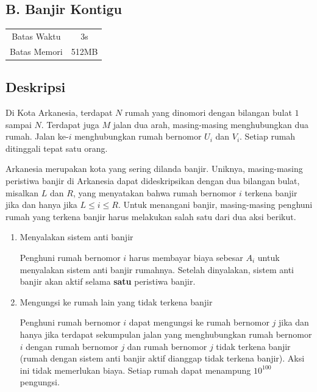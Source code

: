 \documentclass{article}
\begin{document}
\begin{center}
    \section*{B. Banjir Kontigu} %

    \begin{tabular}{ | c c | }
        \hline
        Batas Waktu  & 3s \\    %
        Batas Memori & 512MB \\  %
        \hline
    \end{tabular}
\end{center}

\subsection*{Deskripsi}
Di Kota Arkanesia, terdapat $N$ rumah yang dinomori dengan bilangan bulat $1$ sampai $N$. Terdapat juga $M$ jalan dua arah, masing-masing menghubungkan dua rumah. Jalan ke-$i$ menghubungkan rumah bernomor $U_i$ dan $V_i$. Setiap rumah ditinggali tepat satu orang.

Arkanesia merupakan kota yang sering dilanda banjir. Uniknya, masing-masing peristiwa banjir di Arkanesia dapat dideskripsikan dengan dua bilangan bulat, misalkan $L$ dan $R$, yang menyatakan bahwa rumah bernomor $i$ terkena banjir jika dan hanya jika $L \leq i \leq R$. Untuk menangani banjir, masing-masing penghuni rumah yang terkena banjir harus melakukan salah satu dari dua aksi berikut.
\begin{enumerate}
    \item Menyalakan sistem anti banjir
    
    Penghuni rumah bernomor $i$ harus membayar biaya sebesar $A_i$ untuk menyalakan sistem anti banjir rumahnya. Setelah dinyalakan, sistem anti banjir akan aktif selama \textbf{satu} peristiwa banjir.
    \item Mengungsi ke rumah lain yang tidak terkena banjir
    
    Penghuni rumah bernomor $i$ dapat mengungsi ke rumah bernomor $j$ jika dan hanya jika terdapat sekumpulan jalan yang menghubungkan rumah bernomor $i$ dengan rumah bernomor $j$ dan rumah bernomor $j$ tidak terkena banjir (rumah dengan sistem anti banjir aktif dianggap tidak terkena banjir). Aksi ini tidak memerlukan biaya. Setiap rumah dapat menampung $10^{100}$ pengungsi.
\end{enumerate}
\end{document}
